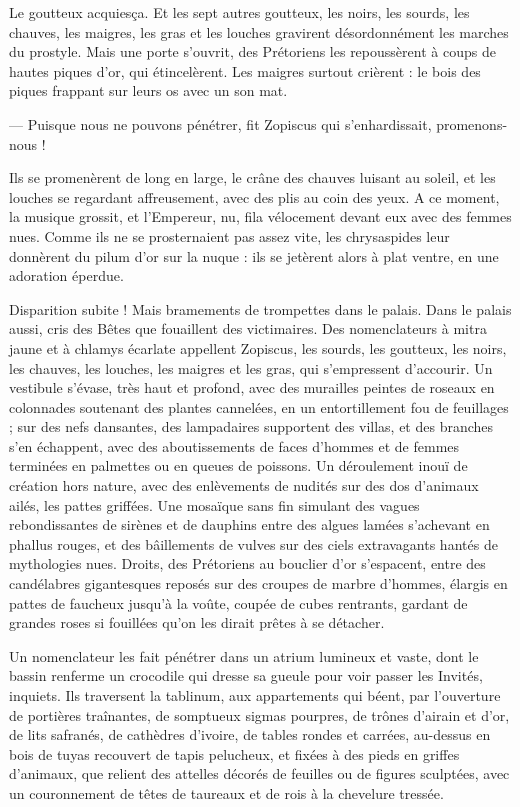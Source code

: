 \documentclass[a4paper, 11pt, oneside, polutonikogreek, french]{article}
\begin{document}
Le goutteux acquiesça. Et les sept autres goutteux, les noirs, les sourds, les chauves, les maigres, les gras et les louches gravirent désordonnément les marches du prostyle. Mais une porte s'ouvrit, des Prétoriens les repoussèrent à coups de hautes piques d'or, qui étincelèrent. Les maigres surtout crièrent : le bois des piques frappant sur leurs os avec un son mat.

--- Puisque nous ne pouvons pénétrer, fit Zopiscus qui s'enhardissait, promenons-nous !

Ils se promenèrent de long en large, le crâne des chauves luisant au soleil, et les louches se regardant affreusement, avec des plis au coin des yeux. A ce moment, la musique grossit, et l'Empereur, nu, fila vélocement devant eux avec des femmes nues. Comme ils ne se prosternaient pas assez vite, les chrysaspides leur donnèrent du pilum d'or sur la nuque : ils se jetèrent alors à plat ventre, en une adoration éperdue.

Disparition subite ! Mais bramements de trompettes dans le palais. Dans le palais aussi, cris des Bêtes que fouaillent des victimaires. Des nomenclateurs à mitra jaune et à chlamys écarlate appellent Zopiscus, les sourds, les goutteux, les noirs, les chauves, les louches, les maigres et les gras, qui s'empressent d'accourir. Un vestibule s'évase, très haut et profond, avec des murailles peintes de roseaux en colonnades soutenant des plantes cannelées, en un entortillement fou de feuillages ; sur des nefs dansantes, des lampadaires supportent des villas, et des branches s'en échappent, avec des aboutissements de faces d'hommes et de femmes terminées en palmettes ou en queues de poissons. Un déroulement inouï de création hors nature, avec des enlèvements de nudités sur des dos d'animaux ailés, les pattes griffées. Une mosaïque sans fin simulant des vagues rebondissantes de sirènes et de dauphins entre des algues lamées s'achevant en phallus rouges, et des bâillements de vulves sur des ciels extravagants hantés de mythologies nues. Droits, des Prétoriens au bouclier d'or s'espacent, entre des candélabres gigantesques reposés sur des croupes de marbre d'hommes, élargis en pattes de faucheux jusqu'à la voûte, coupée de cubes rentrants, gardant de grandes roses si fouillées qu'on les dirait prêtes à se détacher.

Un nomenclateur les fait pénétrer dans un atrium lumineux et vaste, dont le bassin renferme un crocodile qui dresse sa gueule pour voir passer les Invités, inquiets. Ils traversent la tablinum, aux appartements qui béent, par l'ouverture de portières traînantes, de somptueux sigmas pourpres, de trônes d'airain et d'or, de lits safranés, de cathèdres d'ivoire, de tables rondes et carrées, au-dessus en bois de tuyas recouvert de tapis pelucheux, et fixées à des pieds en griffes d'animaux, que relient des attelles décorés de feuilles ou de figures sculptées, avec un couronnement de têtes de taureaux et de rois à la chevelure tressée.
\end{document}
